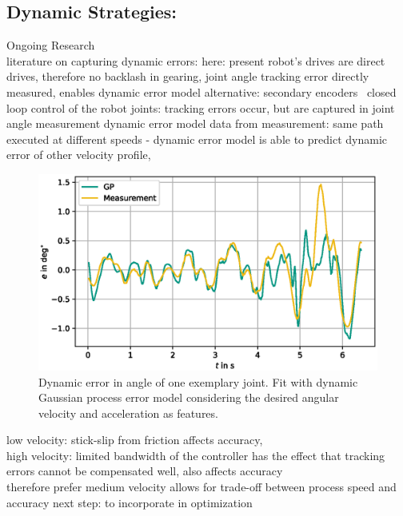 \documentclass[5p,times,procedia]{elsarticle}
\begin{document}
\subsection{Dynamic Strategies:}\label{subsec:dynError} Ongoing Research \\
literature on capturing dynamic errors:
%
here: present robot’s drives are direct drives, therefore no backlash in gearing, joint angle tracking error directly measured, 
enables dynamic error model
alternative: secondary encoders~\cite{Mesmer22}
%
closed loop control of the robot joints: tracking errors occur, but are captured in joint angle measurement
%
dynamic error model
%
data from measurement: same path executed at different speeds - dynamic error model is able to predict dynamic error of other velocity profile,
%
\begin{figure}[htb]
	\centering
	\includegraphics[width=0.95\columnwidth]{graphics/DynError.eps}
	\caption{Dynamic error in angle of one exemplary joint. Fit with dynamic Gaussian process error model considering the desired angular velocity and acceleration as features.}
	\label{fig:error_sources}
\end{figure}
%
low velocity: stick-slip from friction affects accuracy,\\
high velocity: limited bandwidth of the controller has the effect that tracking errors cannot be compensated well, also affects accuracy \\
therefore prefer medium velocity
%
allows for trade-off between process speed and accuracy
%
%
%
next step: to incorporate in optimization
%
\end{document}
